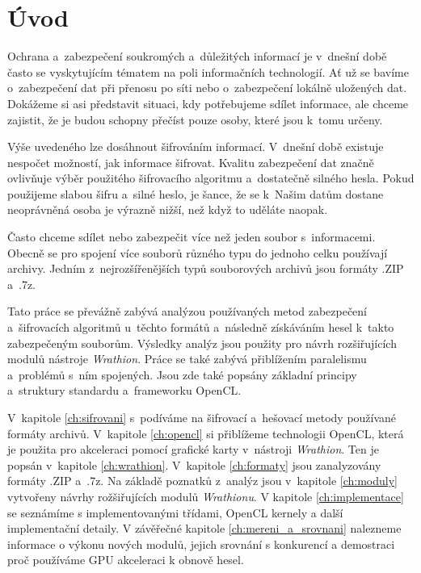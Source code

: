 \chapter{Úvod}
Ochrana a~zabezpečení soukromých a~důležitých informací je v~dnešní době často se vyskytujícím
tématem na poli informačních technologií. Ať už se bavíme o~zabezpečení dat při přenosu po síti
nebo o~zabezpečení lokálně uložených dat. Dokážeme si asi představit situaci, kdy potřebujeme
sdílet informace, ale chceme zajistit, že je budou schopny přečíst pouze osoby, které jsou k~tomu
určeny.

 Výše uvedeného lze dosáhnout šifrováním informací. V~dnešní době existuje nespočet možností, jak
informace šifrovat. Kvalitu zabezpečení dat značně ovlivňuje výběr použitého šifrovacího
algoritmu a~dostatečně silného hesla. Pokud použijeme slabou šifru a~silné heslo, je
šance, že se k~Našim datům dostane neoprávněná osoba je výrazně nižší, než když to uděláte naopak.

 Často chceme sdílet nebo zabezpečit více než jeden soubor s~informacemi. Obecně se pro
spojení více souborů různého typu do jednoho celku používají archivy. Jedním z~nejrozšířenějších
typů souborových archivů jsou formáty .ZIP a~.7z.

 Tato práce se převážně zabývá analýzou používaných metod zabezpečení a~šifrovacích
algoritmů u~těchto formátů a~následně získáváním hesel k~takto zabezpečeným souborům. Výsledky
analýz jsou použity pro návrh rozšiřujících modulů nástroje {\it Wrathion}. Práce se také
zabývá přiblížením paralelismu a~problémů s~ním spojených. Jsou zde také popsány základní
principy a~struktury standardu a~frameworku OpenCL.

 V~kapitole \ref{ch:sifrovani} s~podíváme na šifrovací a~hešovací metody používané formáty
archivů. V~kapitole \ref{ch:opencl} si přiblížeme technologii OpenCL, která je použita pro
akceleraci pomocí grafické karty v~nástroji {\it Wrathion}. Ten je popsán v~kapitole
\ref{ch:wrathion}. V~kapitole \ref{ch:formaty} jsou zanalyzovány formáty .ZIP a~.7z. Na základě
poznatků z~analýz jsou v~kapitole \ref{ch:moduly} vytvořeny návrhy rožšiřujících modulů {\it
Wrathionu}. V kapitole \ref{ch:implementace} se seznámíme s implementovanými třídami, OpenCL
kernely a další implementační detaily. V závěřečné kapitole \ref{ch:mereni_a_srovnani} nalezneme
informace o výkonu nových modulů, jejich srovnání s konkurencí a demostraci proč používáme GPU
akceleraci k obnově hesel.

